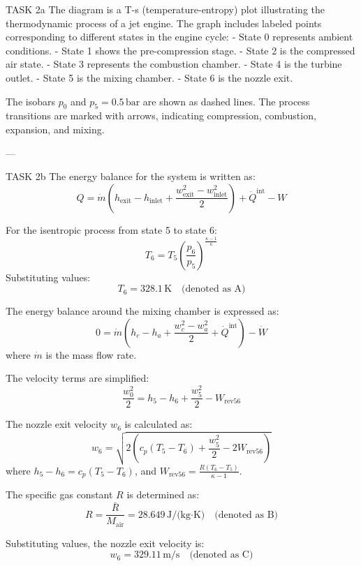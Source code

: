 TASK 2a  
The diagram is a T-s (temperature-entropy) plot illustrating the thermodynamic process of a jet engine. The graph includes labeled points corresponding to different states in the engine cycle:  
- State 0 represents ambient conditions.  
- State 1 shows the pre-compression stage.  
- State 2 is the compressed air state.  
- State 3 represents the combustion chamber.  
- State 4 is the turbine outlet.  
- State 5 is the mixing chamber.  
- State 6 is the nozzle exit.  

The isobars \( p_0 \) and \( p_5 = 0.5 \, \text{bar} \) are shown as dashed lines. The process transitions are marked with arrows, indicating compression, combustion, expansion, and mixing.  

---

TASK 2b  
The energy balance for the system is written as:  
\[
Q = \dot{m} \left( h_{\text{exit}} - h_{\text{inlet}} + \frac{w_{\text{exit}}^2 - w_{\text{inlet}}^2}{2} \right) + \dot{Q}^{\text{int}} - W
\]

For the isentropic process from state 5 to state 6:  
\[
T_6 = T_5 \left( \frac{p_6}{p_5} \right)^{\frac{\kappa - 1}{\kappa}}
\]  
Substituting values:  
\[
T_6 = 328.1 \, \text{K} \quad \text{(denoted as A)}
\]

The energy balance around the mixing chamber is expressed as:  
\[
0 = \dot{m} \left( h_c - h_a + \frac{w_c^2 - w_a^2}{2} + \dot{Q}^{\text{int}} \right) - \dot{W}
\]  
where \( \dot{m} \) is the mass flow rate.  

The velocity terms are simplified:  
\[
\frac{w_0^2}{2} = h_5 - h_6 + \frac{w_5^2}{2} - W_{\text{rev56}}
\]

The nozzle exit velocity \( w_6 \) is calculated as:  
\[
w_6 = \sqrt{2 \left( c_p (T_5 - T_6) + \frac{w_5^2}{2} - 2 W_{\text{rev56}} \right)}
\]  
where \( h_5 - h_6 = c_p (T_5 - T_6) \), and \( W_{\text{rev56}} = \frac{R (T_6 - T_5)}{\kappa - 1} \).  

The specific gas constant \( R \) is determined as:  
\[
R = \frac{\bar{R}}{M_{\text{air}}} = 28.649 \, \text{J/(kg·K)} \quad \text{(denoted as B)}
\]

Substituting values, the nozzle exit velocity is:  
\[
w_6 = 329.11 \, \text{m/s} \quad \text{(denoted as C)}
\]